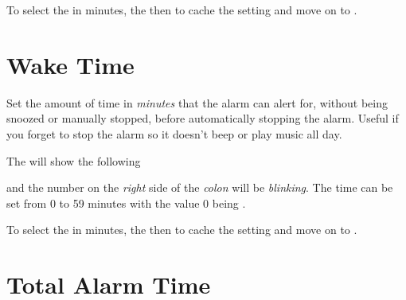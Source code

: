 To select the  in minutes,  the  then 
to cache the setting and move on to .


\section{Wake Time} 

Set the amount of time in \textit{minutes} that the alarm can alert for, without
being snoozed or manually stopped, before automatically stopping the alarm.
Useful if you forget to stop the alarm so it doesn't beep or play music all day.


The  will show the following


and the number on the \textit{right} side of the \textit{colon} will be
\textit{blinking}.  The time can be set from
\num{0} to \num{59} minutes with the value \num{0} being .

\par\medskip

To select the  in minutes,  the  then 
to cache the setting and move on to .


\section{Total Alarm Time} 

